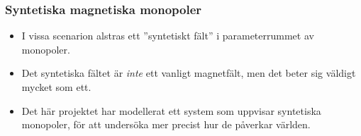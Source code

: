 \documentclass[aspectratio=169]{beamer}
\begin{document}
\begin{frame}
        \frametitle{Syntetiska magnetiska monopoler}
        \begin{itemize}
                \item I vissa scenarion alstras ett
                        ''syntetiskt fält'' i
                        parameterrummet av monopoler.
                \item Det syntetiska fältet är
                        \textit{inte} ett vanligt
                        magnetfält, men det beter sig
                        väldigt mycket som ett.
                \item Det här projektet har modellerat
                        ett system som uppvisar
                        syntetiska monopoler, för att
                        undersöka mer precist hur de
                        påverkar världen.
        \end{itemize}
\end{frame}
\end{document}
